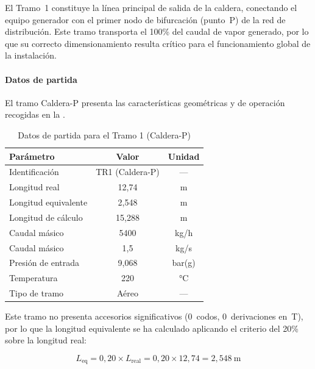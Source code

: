 \documentclass[12pt]{article}
\begin{document}
El Tramo~1 constituye la línea principal de salida de la caldera, conectando el equipo generador con el primer nodo de bifurcación (punto~P) de la red de distribución. Este tramo transporta el 100\% del caudal de vapor generado, por lo que su correcto dimensionamiento resulta crítico para el funcionamiento global de la instalación.

\paragraph{Datos de partida}

El tramo Caldera-P presenta las características geométricas y de operación recogidas en la .

\begin{table}[H]
	\centering
	\caption{Datos de partida para el Tramo 1 (Caldera-P)}
	\label{tab:datos-partida-tramo1}
	\begin{tabular}{lcc}
		\toprule
		\textbf{Parámetro}   & \textbf{Valor}  & \textbf{Unidad} \\
		\midrule
		Identificación       & TR1 (Caldera-P) & ---             \\
		Longitud real        & 12,74           & m               \\
		Longitud equivalente & 2,548           & m               \\
		Longitud de cálculo  & 15,288          & m               \\
		Caudal másico        & 5400            & kg/h            \\
		Caudal másico        & 1,5             & kg/s            \\
		Presión de entrada   & 9,068           & bar(g)          \\
		Temperatura          & 220             & °C              \\
		Tipo de tramo        & Aéreo           & ---             \\
		\bottomrule
	\end{tabular}
\end{table}

Este tramo no presenta accesorios significativos (0~codos, 0~derivaciones en~T), por lo que la longitud equivalente se ha calculado aplicando el criterio del 20\% sobre la longitud real:

\begin{equation}
	L_{\text{eq}} = 0{,}20 \times L_{\text{real}} = 0{,}20 \times 12{,}74 = 2{,}548 \ \text{m}
	\label{eq:Leq-tramo1}
\end{equation}
\end{document}
